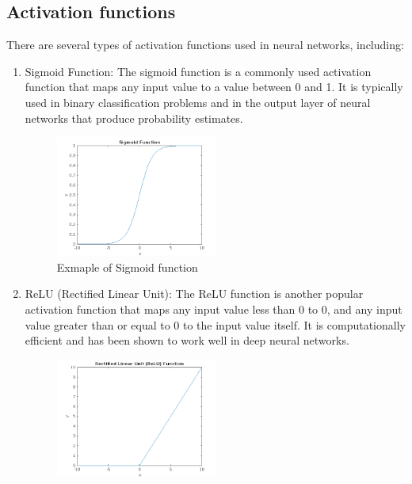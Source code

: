     \subsection{Activation functions} \label{subsec:nnaf}
    There are several types of activation functions used in neural networks, including:
    \begin{enumerate}
        \item Sigmoid Function: The sigmoid function is a commonly used activation function that maps any input value to a value between 0 and 1.
        It is typically used in binary classification problems and in the output layer of neural networks that produce probability estimates.
        \begin{center}
            \begin{figure}[!ht]
                \centering
                \includegraphics[width=0.5\textwidth]{figures/sigmoid}
                \caption{Exmaple of Sigmoid function}
                \label{fig:sigmoid}
            \end{figure}
        \end{center}
        \item ReLU (Rectified Linear Unit): The ReLU function is another popular activation function that maps any input value less than 0 to 0, and any
        input value greater than or equal to 0 to the input value itself. It is computationally efficient and has been shown to work
        well in deep neural networks.
        \begin{center}
            \begin{figure}[!ht]
                \centering
                \includegraphics[width=0.5\textwidth]{figures/relu}

\end{figure}
\end{center}
\end{enumerate}
